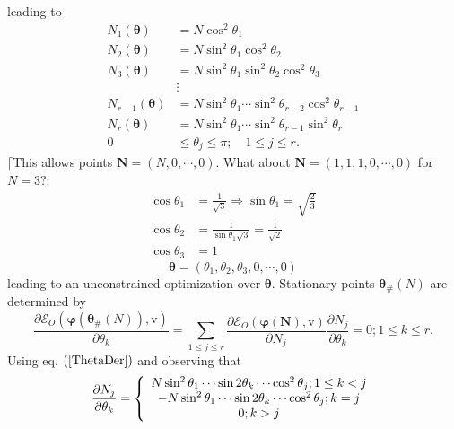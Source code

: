 \documentclass[aps,preprint]{revtex4}%
\begin{document}
leading to%
\begin{align}
N_{1}\left(  \boldsymbol{\theta}\right)   &  =N\cos^{2}\theta_{1}\nonumber\\
N_{2}\left(  \boldsymbol{\theta}\right)   &  =N\sin^{2}\theta_{1}\cos
^{2}\theta_{2}\nonumber\\
N_{3}\left(  \boldsymbol{\theta}\right)   &  =N\sin^{2}\theta_{1}\sin
^{2}\theta_{2}\cos^{2}\theta_{3}\nonumber\\
&  \vdots\nonumber\\
N_{r-1}\left(  \boldsymbol{\theta}\right)   &  =N\sin^{2}\theta_{1}\cdots
\sin^{2}\theta_{r-2}\cos^{2}\theta_{r-1}\nonumber\\
N_{r}\left(  \boldsymbol{\theta}\right)   &  =N\sin^{2}\theta_{1}\cdots
\sin^{2}\theta_{r-1}\sin^{2}\theta_{r}\nonumber\\
0  &  \leq\theta_{j}\leq\pi;\quad1\leq j\leq r.
\end{align}
$\lceil$This allows points $\boldsymbol{N}=\left(  N,0,\cdots,0\right)  $.
What about $\boldsymbol{N}=\left(  1,1,1,0,\cdots,0\right)  $ for $N=3?:$%
\begin{align*}
\cos\theta_{1}  &  =\frac{1}{\sqrt{3}}\Rightarrow\sin\theta_{1}=\sqrt{\frac
{2}{3}}\\
\cos\theta_{2}  &  =\frac{1}{\sin\theta_{1}\sqrt{3}}=\frac{1}{\sqrt{2}}\\
\cos\theta_{3}  &  =1
\end{align*}%
\[
\boldsymbol{\theta}=\left(  \theta_{1},\theta_{2},\theta_{3},0,\cdots
,0\right)
\]
leading to an unconstrained optimization over $\boldsymbol{\theta}$.
Stationary points $\boldsymbol{\theta}_{\#}\left(  N\right)  $ are determined
by
\begin{equation}
\frac{\partial\mathcal{E}_{O}\left(  \boldsymbol{\varphi}\left(
\boldsymbol{\theta}_{\#}\left(  N\right)  \right)  \boldsymbol{,}%
\mathrm{v}\right)  }{\partial\theta_{k}}=\sum\limits_{1\leq j\leq r}%
\frac{\partial\mathcal{E}_{O}\left(  \boldsymbol{\varphi}\left(
\boldsymbol{N}\right)  \boldsymbol{,}\mathrm{v}\right)  }{\partial N_{j}}%
\frac{\partial N_{j}}{\partial\theta_{k}}=0;1\leq k\leq r. \label{ThetaDer}%
\end{equation}
Using eq. $\left(  \ref{ThetaDer}\right)  $ and observing that
\begin{equation}
\frac{\partial N_{j}}{\partial\theta_{k}}=\left\{
\begin{array}
[c]{c}%
N\sin^{2}\theta_{1}\cdots\sin2\theta_{k}\cdots\cos^{2}\theta_{j};1\leq k<j\\
-N\sin^{2}\theta_{1}\cdots\sin2\theta_{k}\cdots\cos^{2}\theta_{j};k=j\\
0;k>j
\end{array}
\right.
\end{equation}
\end{document}
